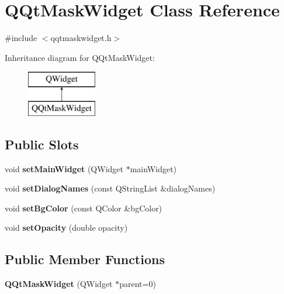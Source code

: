 \hypertarget{class_q_qt_mask_widget}{}\section{Q\+Qt\+Mask\+Widget Class Reference}
\label{class_q_qt_mask_widget}


{\ttfamily \#include $<$qqtmaskwidget.\+h$>$}

Inheritance diagram for Q\+Qt\+Mask\+Widget\+:\begin{figure}[H]
\begin{center}
\leavevmode
\includegraphics[height=2.000000cm]{class_q_qt_mask_widget}
\end{center}
\end{figure}
\subsection*{Public Slots}
\begin{DoxyCompactItemize}
\item 
\mbox{\label{class_q_qt_mask_widget_a6dee75df800739a67fc5ad81a1ac3973}} 
void {\bfseries set\+Main\+Widget} (Q\+Widget $\ast$main\+Widget)
\item 
\mbox{\label{class_q_qt_mask_widget_adbfebdaf49b2b0c4e8f301ffdf2ba80a}} 
void {\bfseries set\+Dialog\+Names} (const Q\+String\+List \&dialog\+Names)
\item 
\mbox{\label{class_q_qt_mask_widget_adb4cdf140231e86a0e7f78428ed3a41c}} 
void {\bfseries set\+Bg\+Color} (const Q\+Color \&bg\+Color)
\item 
\mbox{\label{class_q_qt_mask_widget_ade4d27074a8435dce567bac260ef5f25}} 
void {\bfseries set\+Opacity} (double opacity)
\end{DoxyCompactItemize}
\subsection*{Public Member Functions}
\begin{DoxyCompactItemize}
\item 
\mbox{\label{class_q_qt_mask_widget_a1d1992519b616d1186c818abc6fbb704}} 
{\bfseries Q\+Qt\+Mask\+Widget} (Q\+Widget $\ast$parent=0)
\end{DoxyCompactItemize}
